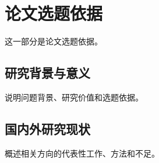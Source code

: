 \section{论文选题依据}
这一部分是论文选题依据。
\subsection{研究背景与意义}
说明问题背景、研究价值和选题依据\cite{guo2025deepseek}。

\subsection{国内外研究现状}
概述相关方向的代表性工作、方法和不足。
